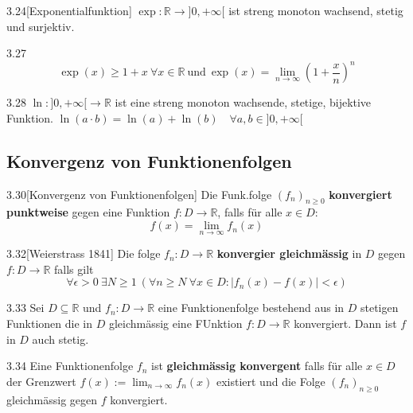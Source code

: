 \documentclass[8pt,a4paper,twocolumn,table]{extarticle}
\newcommand{\R}{\mathbb{R}}
\begin{document}
\begin{satz}{3.24}[Exponentialfunktion]
    $\exp: \R \to ]0,+\infty[$ ist streng monoton wachsend, stetig und surjektiv.
\end{satz}

\begin{korollar}{3.27}
    \[
        \exp(x) \ge 1 + x\ \forall x \in \R\ \mbox{und}\
        \exp(x) = \lim_{n \to \infty} \left( 1 + \frac{x}{n} \right)^n \]
\end{korollar}

\begin{korollar}{3.28}
    $\ln: ]0,+\infty[ \to \R$ ist eine streng monoton wachsende, stetige, bijektive Funktion.
            $\ln(a \cdot b) = \ln(a) + \ln(b)\quad \forall a,b \in ]0,+\infty[$
\end{korollar}

\subsection{Konvergenz von Funktionenfolgen}
\begin{definition}{3.30}[Konvergenz von Funktionenfolgen]
    Die Funk.folge $(f_n)_{n \ge 0}$ \textbf{konvergiert punktweise} gegen eine Funktion $f: D \to \R$, falls für alle $x \in D$:
    \[ f(x) = \lim_{n \to \infty} f_n(x) \]
\end{definition}

\begin{definition}{3.32}[Weierstrass 1841]
    Die folge $f_n: D \to \R$ \textbf{konvergier gleichmässig} in $D$ gegen $f: D \to \R$ falls gilt
    \[ \forall \epsilon > 0\ \exists N \ge 1\ (\forall n \ge N\ \forall x \in D : |f_n(x) - f(x)| < \epsilon ) \]
\end{definition}

\begin{satz}{3.33}
    Sei $D \subseteq \R$ und $f_n : D \to \R$ eine Funktionenfolge bestehend aus in $D$ stetigen Funktionen die in $D$ gleichmässig eine FUnktion $f: D \to \R$ konvergiert.
    Dann ist $f$ in $D$ auch stetig.
\end{satz}

\begin{definition}{3.34}
    Eine Funktionenfolge $f_n$ ist \textbf{gleichmässig konvergent} falls für alle $x \in D$ der Grenzwert $f(x) := \lim_{n \to \infty} f_n(x)$
    existiert und die Folge $(f_n)_{n \ge 0}$ gleichmässig gegen $f$ konvergiert.
\end{definition}
\end{document}
